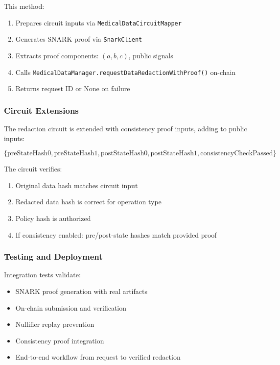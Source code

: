 This method:
\begin{enumerate}
    \item Prepares circuit inputs via \texttt{MedicalDataCircuitMapper}
    \item Generates SNARK proof via \texttt{SnarkClient}
    \item Extracts proof components: $(a, b, c)$, public signals
    \item Calls \texttt{MedicalDataManager.requestDataRedactionWithProof()} on-chain
    \item Returns request ID or None on failure
\end{enumerate}

\subsubsection{Circuit Extensions}

The redaction circuit is extended with consistency proof inputs, adding to public inputs:

\begin{equation}
    \{\text{preStateHash0}, \text{preStateHash1}, \text{postStateHash0}, \text{postStateHash1}, \text{consistencyCheckPassed}\}
\end{equation}

The circuit verifies:
\begin{enumerate}
    \item Original data hash matches circuit input
    \item Redacted data hash is correct for operation type
    \item Policy hash is authorized
    \item If consistency enabled: pre/post-state hashes match provided proof
\end{enumerate}

\subsubsection{Testing and Deployment}

Integration tests validate:
\begin{itemize}
    \item SNARK proof generation with real artifacts
    \item On-chain submission and verification
    \item Nullifier replay prevention
    \item Consistency proof integration
    \item End-to-end workflow from request to verified redaction
\end{itemize}


